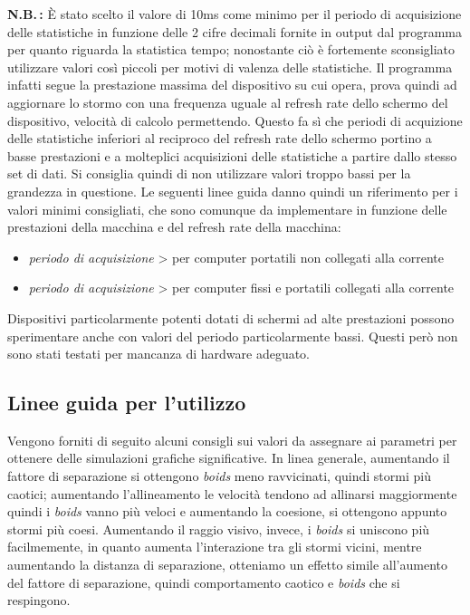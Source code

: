 \documentclass{article}
\begin{document}
\textbf{N.B.\,:} È stato scelto il valore di 10ms come minimo per il periodo di acquisizione delle statistiche in funzione delle 2 cifre decimali fornite in output dal programma per quanto riguarda la statistica tempo; nonostante ciò è fortemente sconsigliato utilizzare valori così piccoli per motivi di valenza delle statistiche. Il programma infatti segue la prestazione massima del dispositivo su cui opera, prova quindi ad aggiornare lo stormo con una frequenza uguale al refresh rate dello schermo del dispositivo, velocità di calcolo permettendo. Questo fa sì che periodi di acquizione delle statistiche inferiori al reciproco del refresh rate dello schermo portino a basse prestazioni e a molteplici acquisizioni delle statistiche a partire dallo stesso set di dati. Si consiglia quindi di non utilizzare valori troppo bassi per la grandezza in questione. Le seguenti linee guida danno quindi un riferimento per i valori minimi consigliati, che sono comunque da implementare in funzione delle prestazioni della macchina e del refresh rate della macchina:
\begin{itemize}
    \item \:\textit{periodo di acquisizione} \textgreater{} per computer portatili non collegati alla corrente
    \item \:\textit{periodo di acquisizione} \textgreater{} per computer fissi e portatili collegati alla corrente
\end{itemize} 
Dispositivi particolarmente potenti dotati di schermi ad alte prestazioni possono sperimentare anche con valori del periodo particolarmente bassi. Questi però non sono stati testati per mancanza di hardware adeguato. 

\subsection{Linee guida per l'utilizzo}
Vengono forniti di seguito alcuni consigli sui valori da assegnare ai parametri per ottenere delle simulazioni grafiche significative. In linea generale, aumentando il fattore di separazione si ottengono \textit{boids} meno ravvicinati, quindi stormi più caotici; aumentando l'allineamento le velocità tendono ad allinarsi maggiormente quindi i \textit{boids} vanno più veloci e aumentando la coesione, si ottengono appunto stormi più coesi. Aumentando il raggio visivo, invece, i \textit{boids} si uniscono più facilmemente, in quanto aumenta l'interazione tra gli stormi vicini, mentre aumentando la distanza di separazione, otteniamo un effetto simile all'aumento del fattore di separazione, quindi comportamento caotico e \textit{boids} che si respingono.
\end{document}
